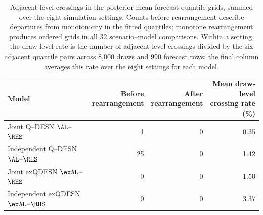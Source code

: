 \begin{table}[!htbp]
\centering
\small
\begin{tabular}{@{}>{\raggedright\arraybackslash}p{}rrr@{}}
\toprule
Model & \shortstack{Before\\rearrangement} & \shortstack{After\\rearrangement} & \shortstack{Mean draw-level\\crossing rate (\%)} \\
\midrule
Joint Q--DESN \(\AL\)--\(\RHS\) & 1 & 0 & 0.35 \\
Independent Q--DESN \(\AL\)--\(\RHS\) & 25 & 0 & 1.42 \\
Joint exQDESN \(\exAL\)--\(\RHS\) & 0 & 0 & 1.50 \\
Independent exQDESN \(\exAL\)--\(\RHS\) & 0 & 0 & 3.37 \\
\bottomrule
\end{tabular}
\caption{Adjacent-level crossings in the posterior-mean forecast quantile grids, summed over the eight simulation settings. Counts before rearrangement describe departures from monotonicity in the fitted quantiles; monotone rearrangement produces ordered grids in all 32 scenario--model comparisons. Within a setting, the draw-level rate is the number of adjacent-level crossings divided by the six adjacent quantile pairs across 8,000 draws and 990 forecast rows; the final column averages this rate over the eight settings for each model.}
\label{tab:supp-joint-qdesn-crossings}
\end{table}
